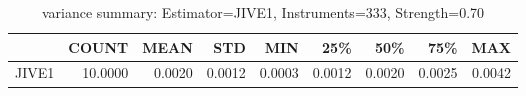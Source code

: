 \begin{table}[ht]
\centering
\caption{variance summary: Estimator=JIVE1, Instruments=333, Strength=0.70}
\begin{tabular}{lrrrrrrrr}
\toprule
 & COUNT & MEAN & STD & MIN & 25\% & 50\% & 75\% & MAX \\
\midrule
JIVE1 & 10.0000 & 0.0020 & 0.0012 & 0.0003 & 0.0012 & 0.0020 & 0.0025 & 0.0042 \\
\bottomrule
\end{tabular}
\end{table}
